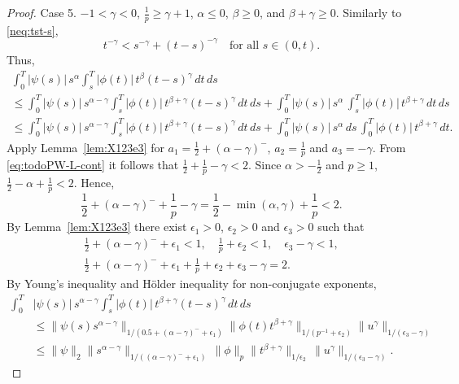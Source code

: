 \documentclass{article}
\theoremstyle{plain}
\theoremstyle{remark}
\theoremstyle{definition}
\begin{document}
\begin{proof}
Case 5.
$-1<\gamma<0$, $\frac1p\ge\gamma+1$,
$\alpha\le 0$, $\beta\ge 0$, and
$\beta+\gamma\ge0$.
Similarly to \eqref{neq:tst-s},
\begin{equation*}
t^{-\gamma} < s^{-\gamma} + (t-s)^{-\gamma}
\quad \mbox{for all $s\in(0,t)$}.
\end{equation*}
Thus,
\begin{multline*}
		\int_0^T |\psi(s)|\, s^\alpha
		\int_s^T |\phi(t)|\, t^\beta (t{-}s)^\gamma
		\, dt \, ds
\\ \le
		\int_0^T\! |\psi(s)|\, s^{\alpha-\gamma}
		\int_s^T\! |\phi(t)|\, t^{\beta+\gamma} (t{-}s)^\gamma
		\, dt \, ds
+
		\int_0^T\! |\psi(s)|\, s^\alpha\,
		\int_s^T\! |\phi(t)|\, t^{\beta+\gamma}
		\, dt \, ds
\\ \le
		\int_0^T\! |\psi(s)|\, s^{\alpha-\gamma}
		\int_s^T\! |\phi(t)|\, t^{\beta+\gamma} (t{-}s)^\gamma
		\, dt \, ds
+
		\int_0^T\! |\psi(s)|\, s^\alpha\,  ds\,
		\int_0^T\! |\phi(t)|\, t^{\beta+\gamma}
		\, dt.
\end{multline*}
Apply Lemma~\ref{lem:X123e3}
for $a_1 = \frac12 + (\alpha-\gamma)^-$,
$a_2 = \frac{1}{p}$ and
$a_3 = -\gamma$.
From \eqref{eq:todoPW-L-cont} it follows
that $\frac12 + \frac{1}{p}  - \gamma < 2$.
Since $\alpha>-\frac12$ and $p\ge 1$,
$\frac12 - \alpha + \frac{1}{p}< 2$.
Hence,
\[
\frac12 + (\alpha-\gamma)^- + \frac{1}{p}
- \gamma
= \frac12 - \min(\alpha,\gamma) + \frac{1}{p} < 2.
\]
By Lemma~\ref{lem:X123e3} there exist
$\epsilon_1>0$, $\epsilon_2>0$ and
$\epsilon_3>0$ such that
\begin{gather*}
\frac12 + (\alpha-\gamma)^- + \epsilon_1 < 1,
\quad
\frac{1}{p} + \epsilon_2 < 1,
\quad
\epsilon_3 - \gamma < 1, \\
\frac12 + (\alpha-\gamma)^- + \epsilon_1 +
\frac{1}{p} + \epsilon_2 +
\epsilon_3 - \gamma = 2.
\end{gather*}
By Young's inequality and
H\"older inequality for non-conjugate exponents,
\begin{align*}
\int_0^T\! &|\psi(s)|\, s^{\alpha-\gamma}
		\int_s^T\! |\phi(t)|\, t^{\beta+\gamma} (t{-}s)^\gamma
		\, dt \, ds
\\ &\le
\|\psi(s) s^{\alpha-\gamma}\|
_{1/(0.5+(\alpha-\gamma)^- + \epsilon_1)}
\|\phi(t) t^{\beta+\gamma}\|
_{1/(p^{-1}+\epsilon_2)}
\|u^\gamma\|
_{1/(\epsilon_3-\gamma)}
\\ &\le
\|\psi\|_2
\|s^{\alpha-\gamma}\|
_{1/((\alpha-\gamma)^- + \epsilon_1)} \,
\|\phi\|_p
\|t^{\beta+\gamma}\|
_{1/\epsilon_2} \,
\|u^\gamma\|_{1/(\epsilon_3-\gamma)} .
\end{align*}

\end{proof}
\end{document}
